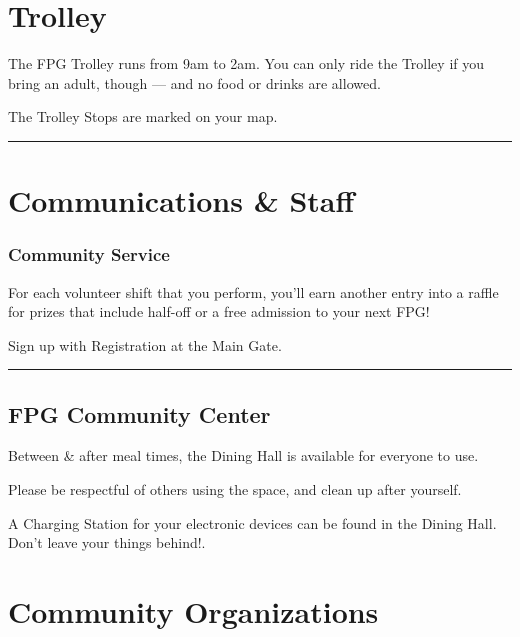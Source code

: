 \documentclass[9pt,twoside,openright,final,article,letterpaper]{memoir}
\renewcommand{\pfbreakdisplay}{%
  \needspace{24pt}%
  \vspace{8pt}\\\ding{76}\quad\ding{77}\quad\ding{78}\\%
  \vspace{11pt}}
\let\oldsection=\section
\renewcommand{\section}[1]{%
  \nopagebreak
  \vspace{6pt} %
  \needspace{1.5in}
  \oldsection{#1}
  \nopagebreak}
\let\oldsubsection=\subsection
\renewcommand{\subsection}[1]{%
  \vspace{6pt}
  \needspace{1.25in}
  \oldsubsection{#1}
  \nopagebreak}
\let\oldsubsubsection=\subsubsection
\renewcommand{\subsubsection}[1]{%
  \needspace{.75in}
  \oldsubsubsection{#1}
  \nopagebreak}
\begin{document}
\begin{multicols}{3}

  \section{Trolley}

  The FPG Trolley runs from 9am to 2am. You can only ride the Trolley
  if you bring an adult, though --- and no food or drinks are allowed.

  The Trolley Stops are marked on your map.

  \fancybreak{\pfbreakdisplay}

  \section{Communications \& Staff}


  \subsubsection{Community Service}

  For each volunteer shift that you perform, you'll earn another entry
  into a raffle for prizes that include half-off or a free admission
  to your next FPG!

  Sign up with Registration at the Main Gate.

  \fancybreak{\pfbreakdisplay}

  \subsection{FPG Community Center}

  Between \& after meal times, the Dining Hall is available for
  everyone to use.

  Please be respectful of others using the space, and clean up
  after yourself.

  A Charging Station for your electronic devices can be found in the
  Dining Hall. {\small Don't leave your things behind!.}

  \columnbreak


  \vfill
\end{multicols}

\section{Community Organizations}
\end{document}
